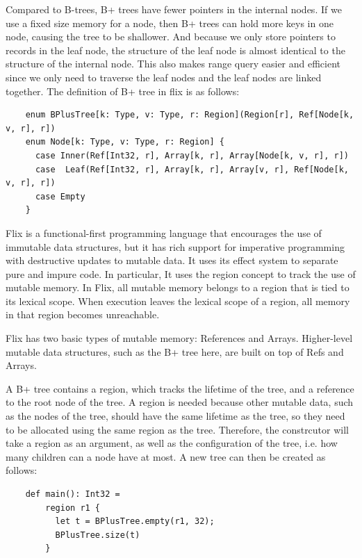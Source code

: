 \documentclass[11pt]{report}
\theoremstyle{definition}
\begin{document}
Compared to B-trees, B+ trees have fewer pointers in the internal nodes. If we use a fixed size memory for a node, then B+ trees can hold more keys in one node, causing the tree to be shallower. And because we only store pointers to records in the leaf node, the structure of the leaf node is almost identical to the structure of the internal node. This also makes range query easier and efficient since we only need to traverse the leaf nodes and the leaf nodes are linked together. The definition of B+ tree in flix is as follows:

\begin{verbatim}
    enum BPlusTree[k: Type, v: Type, r: Region](Region[r], Ref[Node[k, v, r], r])
    enum Node[k: Type, v: Type, r: Region] {
      case Inner(Ref[Int32, r], Array[k, r], Array[Node[k, v, r], r])
      case  Leaf(Ref[Int32, r], Array[k, r], Array[v, r], Ref[Node[k, v, r], r])
      case Empty
    }
\end{verbatim}

Flix is a functional-first programming language that encourages the use of immutable data structures, but it has rich support for imperative programming with destructive updates to mutable data. It uses its effect system to separate pure and impure code. In particular, It uses the region concept to track the use of mutable memory. In Flix, all mutable memory belongs to a region that is tied to its lexical scope. When execution leaves the lexical scope of a region, all memory in that region becomes unreachable.

Flix has two basic types of mutable memory: References and Arrays. Higher-level mutable data structures, such as the B+ tree here, are built on top of Refs and Arrays.

A B+ tree contains a region, which tracks the lifetime of the tree, and a reference to the root node of the tree. A region is needed because other mutable data, such as the nodes of the tree, should have the same lifetime as the tree, so they need to be allocated using the same region as the tree. Therefore, the constrcutor will take a region as an argument, as well as the configuration of the tree, i.e. how many children can a node have at most. A new tree can then be created as follows:

\begin{verbatim}
    def main(): Int32 =
        region r1 {
          let t = BPlusTree.empty(r1, 32);
          BPlusTree.size(t)
        }
\end{verbatim}
\end{document}
